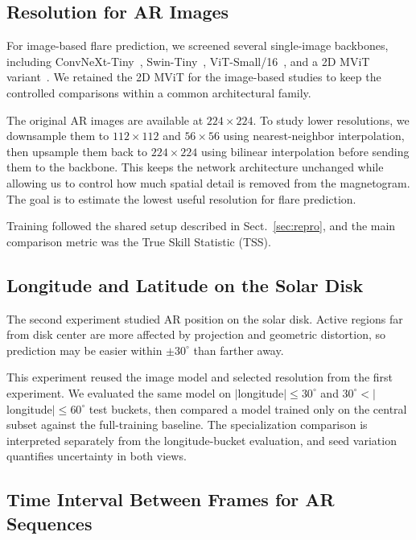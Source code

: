 \documentclass[runningheads]{llncs}
\begin{document}
\subsection{Resolution for AR Images}

For image-based flare prediction, we screened several single-image backbones, including ConvNeXt-Tiny~\cite{ref_convnext}, Swin-Tiny~\cite{ref_swin}, ViT-Small/16~\cite{ref_vit}, and a 2D MViT variant~\cite{ref_mvit}. We retained the 2D MViT for the image-based studies to keep the controlled comparisons within a common architectural family.

The original AR images are available at $224 \times 224$. To study lower resolutions, we downsample them to $112 \times 112$ and $56 \times 56$ using nearest-neighbor interpolation, then upsample them back to $224 \times 224$ using bilinear interpolation before sending them to the backbone. This keeps the network architecture unchanged while allowing us to control how much spatial detail is removed from the magnetogram. The goal is to estimate the lowest useful resolution for flare prediction.

Training followed the shared setup described in Sect.~\ref{sec:repro}, and the main comparison metric was the True Skill Statistic (TSS).

\subsection{Longitude and Latitude on the Solar Disk}

The second experiment studied AR position on the solar disk. Active regions far from disk center are more affected by projection and geometric distortion, so prediction may be easier within $\pm 30^\circ$ than farther away.

This experiment reused the image model and selected resolution from the first experiment. We evaluated the same model on $|$longitude$| \leq 30^\circ$ and $30^\circ < |$longitude$| \leq 60^\circ$ test buckets, then compared a model trained only on the central subset against the full-training baseline. The specialization comparison is interpreted separately from the longitude-bucket evaluation, and seed variation quantifies uncertainty in both views.

\subsection{Time Interval Between Frames for AR Sequences}
\end{document}
